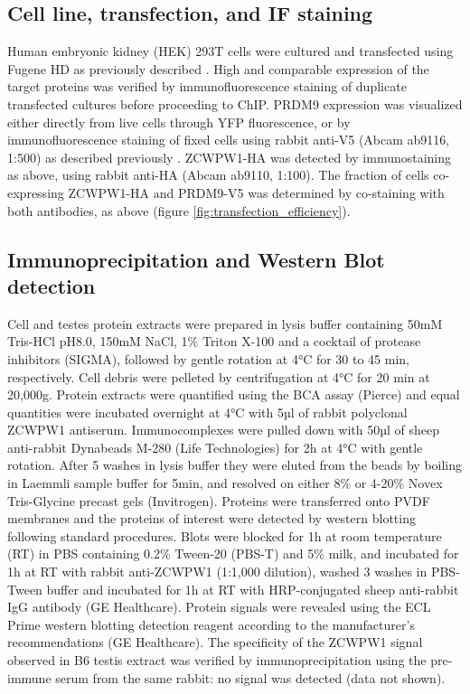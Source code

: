 \subsection{Cell line, transfection, and IF staining}
Human embryonic kidney (HEK) 293T cells were cultured and transfected using Fugene HD as previously described \parencite{Altemose2017map}. High and comparable expression of the target proteins was verified by immunofluorescence staining of duplicate transfected cultures before proceeding to ChIP. PRDM9 expression was visualized either directly from live cells through YFP fluorescence, or by immunofluorescence staining of fixed cells using rabbit anti-V5 (Abcam ab9116, 1:500) as described previously \parencite{Altemose2017map}. ZCWPW1-HA was detected by immunostaining as above, using rabbit anti-HA (Abcam ab9110, 1:100). The fraction of cells co-expressing ZCWPW1-HA and PRDM9-V5 was determined by co-staining with both antibodies, as above (figure \ref{fig:transfection_efficiency}).

\subsection{Immunoprecipitation and Western Blot detection}
\label{sec:IP}
Cell and testes protein extracts were prepared in lysis buffer containing 50mM Tris-HCl pH8.0, 150mM NaCl, 1\% Triton X-100 and a cocktail of protease inhibitors (SIGMA), followed by gentle rotation at 4°C for 30 to 45 min, respectively. Cell debris were pelleted by centrifugation at 4°C for 20 min at 20,000g. Protein extracts were quantified using the BCA assay (Pierce) and equal quantities were incubated overnight at 4°C with 5µl of rabbit polyclonal ZCWPW1 antiserum. Immunocomplexes were pulled down with 50µl of sheep anti-rabbit Dynabeads M-280 (Life Technologies) for 2h at 4°C with gentle rotation. After 5 washes in lysis buffer they were eluted from the beads by boiling in Laemmli sample buffer for 5min, and resolved on either 8\% or 4-20\% Novex Tris-Glycine precast gels (Invitrogen). Proteins were transferred onto PVDF membranes and the proteins of interest were detected by western blotting following standard procedures. Blots were blocked for 1h at room temperature (RT) in PBS containing 0.2\% Tween-20 (PBS-T) and 5\% milk, and incubated for 1h at RT with rabbit anti-ZCWPW1 (1:1,000 dilution), washed 3 washes in PBS-Tween buffer and incubated for 1h at RT with HRP-conjugated sheep anti-rabbit IgG antibody (GE Healthcare). Protein signals were revealed using the ECL Prime western blotting detection reagent according to the manufacturer’s recommendations (GE Healthcare). The specificity of the ZCWPW1 signal observed in B6 testis extract was verified by immunoprecipitation using the pre-immune serum from the same rabbit: no signal was detected (data not shown).

